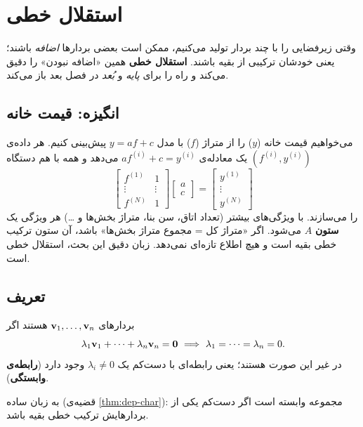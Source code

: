 \chapter{استقلال خطی}
\label{ch:independence}

وقتی زیرفضایی را با چند بردار تولید می‌کنیم، ممکن است بعضی بردارها \emph{اضافه} باشند؛ یعنی خودشان ترکیبی از بقیه باشند. \textbf{استقلال خطی} همین «اضافه نبودن» را دقیق می‌کند و راه را برای \emph{پایه } و \emph{بُعد } در فصل بعد باز می‌کند.

\section{انگیزه: قیمت خانه}

می‌خواهیم قیمت خانه ($y$) را از متراژ ($f$) با مدل $y=af+c$ پیش‌بینی کنیم. هر داده‌ی $(f^{(i)},y^{(i)})$ یک معادله‌ی $af^{(i)}+c=y^{(i)}$ می‌دهد و همه با هم دستگاه
\[
\begin{bmatrix}f^{(1)}&1\\ \vdots&\vdots\\ f^{(N)}&1\end{bmatrix}\begin{bmatrix}a\\c\end{bmatrix}=\begin{bmatrix}y^{(1)}\\ \vdots\\ y^{(N)}\end{bmatrix}
\]
را می‌سازند. با ویژگی‌های بیشتر (تعداد اتاق، سن بنا، متراژ بخش‌ها و …) هر ویژگی یک \textbf{ستون} $A$ می‌شود. اگر «متراژ کل = مجموع متراژ بخش‌ها» باشد، آن ستون ترکیب خطی  بقیه است و هیچ اطلاع تازه‌ای نمی‌دهد. زبان دقیق این بحث، استقلال خطی است.

\section{تعریف}

\begin{definition}
بردارهای $\mathbf{v}_1,\dots,\mathbf{v}_n$  هستند اگر
\[
\lambda_1\vv_1+\dots+\lambda_n\vv_n=\zero\ \Longrightarrow\ \lambda_1=\dots=\lambda_n=0 .
\]
در غیر این صورت  هستند؛ یعنی رابطه‌ای با دست‌کم یک $\lambda_i\neq0$ وجود دارد (\textbf{رابطه‌ی وابستگی}).
\end{definition}

به زبان ساده (قضیه‌ی \ref{thm:dep-char}): مجموعه وابسته است اگر دست‌کم یکی از بردارهایش ترکیب خطی بقیه باشد.


